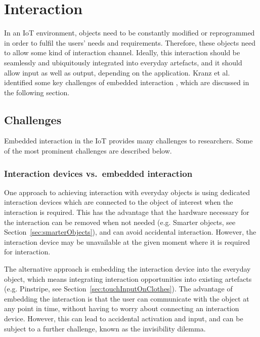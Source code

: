 \section{Interaction}
\label{sec:interaction}
In an IoT environment, objects need to be constantly modified or reprogrammed in order to fulfil the users' needs and requirements. 
Therefore, these objects need to allow some kind of interaction channel. 
Ideally, this interaction should be seamlessly and ubiquitously integrated into everyday artefacts, and it should allow input as well as output, depending on the application. 
Kranz et al. identified some key challenges of embedded interaction \cite{kranz10}, which are discussed in the following section.

\subsection{Challenges}
\label{sec:challenges}
Embedded interaction in the IoT provides many challenges to researchers. Some of the most prominent challenges are described below.

\subsubsection{Interaction devices vs.\ embedded interaction}
One approach to achieving interaction with everyday objects is using dedicated interaction devices which are connected to the object of interest when the interaction is required.
This has the advantage that the hardware necessary for the interaction can be removed when not needed (e.g. Smarter objects, see Section~\ref{sec:smarterObjects}), and can avoid accidental interaction. 
However, the interaction device may be unavailable at the given moment where it is required for interaction.

The alternative approach is embedding the interaction device into the everyday object, which means integrating interaction opportunities into existing artefacts (e.g. Pinstripe, see Section~\ref{sec:touchInputOnClothes}). 
The advantage of embedding the interaction is that the user can communicate with the object at any point in time, without having to worry about connecting an interaction device.
However, this can lead to accidental activation and input, and can be subject to a further challenge, known as the invisibility dilemma.

